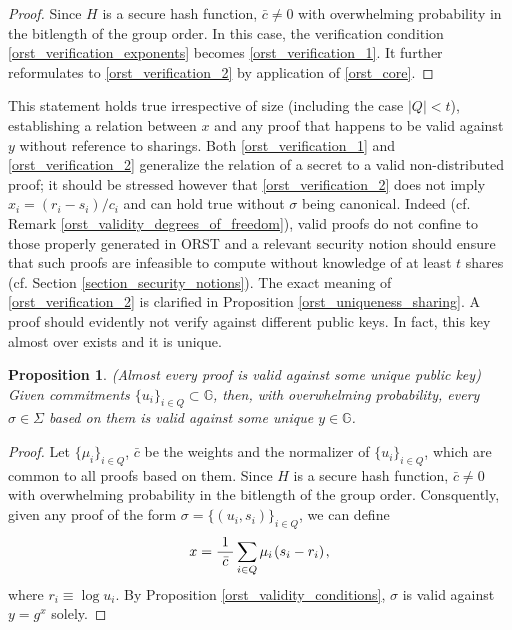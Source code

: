 \documentclass[psamsfonts, reqno]{amsart}
\newtheorem{prop}[thm]{Proposition}
\theoremstyle{definition}
\theoremstyle{remark}
\numberwithin{equation}{section}
\begin{document}
\begin{proof}
Since $H$
is a secure hash function,
$\bar{c} \neq 0$ with overwhelming probability
in the bitlength of the group order.
In this case,
the verification condition \eqref{orst_verification_exponents}
becomes \eqref{orst_verification_1}.
It further reformulates to
\eqref{orst_verification_2} by application of \eqref{orst_core}.
\vspace{5pt}
\end{proof}

\noindent
This statement holds true irrespective of size
(including the case $|Q| < t$),
establishing a relation between $x$ and any proof
that happens to be valid against $y$
without reference to sharings.
Both \eqref{orst_verification_1} and \eqref{orst_verification_2}
generalize the relation of a secret to a
valid non-distributed proof;
it should be stressed however that
\eqref{orst_verification_2} does not imply
$x_i = (r_i - s_i)/c_i$ and
can hold true without $\sigma$ being canonical.
Indeed (cf. Remark \ref{orst_validity_degrees_of_freedom}),
valid proofs do not confine to those properly
generated in \textsf{ORST} and a relevant security notion
should ensure that such proofs are infeasible to compute
without knowledge of at least $t$ shares
(cf. Section \ref{section_security_notions}).
The exact meaning of \eqref{orst_verification_2}
is clarified in Proposition \ref{orst_uniqueness_sharing}.
A proof should evidently not verify against
different public keys.
In fact, this key almost over exists and it is unique.

\begin{prop}\label{orst_uniqueness_public_key}
\textup{(\textit{Almost every proof is valid against
some unique public key})}
Given commitments $\{u_i\}_{i \in Q} \subset \mathbb{G}$,
then, with overwhelming probability,
every $\sigma \in \Sigma$ based on them
is valid against some unique $y \in \mathbb{G}$.
\end{prop}

\begin{proof}
Let $\{\mu_i\}_{i \in Q}$, $\bar{c}$
be the weights and the normalizer of $\{u_i\}_{i \in Q}$,
which are common to all proofs based on them.
Since $H$ is a secure hash function,
$\bar{c} \neq 0$ with overwhelming probability in
the bitlength of the group order.
Consquently, given any proof of the form
$\sigma = \{(u_i, s_i)\}_{i \in Q}$, we can define
\vspace{5pt}
\begin{equation*}
x = \frac{1}{\ \bar{c}\ }
\sum_{i \in Q} \mu_i\hspace{1pt}(s_i - r_i)\hspace{1pt},
\vspace{5pt}
\end{equation*}
where $r_i \equiv \log u_i$.
By Proposition \ref{orst_validity_conditions},
$\sigma$ is valid against $y = g ^ x$ solely.
\vspace{5pt}
\end{proof}
\end{document}
